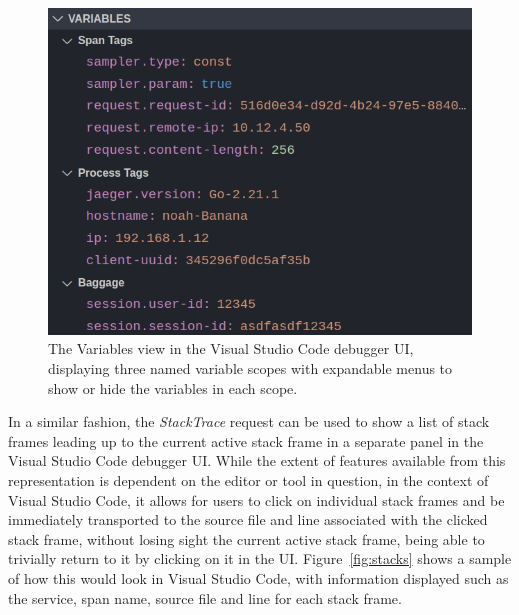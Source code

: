 \documentclass[12pt,pdftex,titlepage]{report}
\begin{document}
            \begin{figure}[htb!]
                \centering
                \includegraphics[scale=1.7]{scopes.png}
                \caption[Visual Studio Code debugger UI - Variables view]{The Variables view in the Visual Studio Code debugger UI, displaying three named variable scopes with expandable menus to show or hide the variables
                in each scope.}
                \label{fig:scopes}
            \end{figure}

            In a similar fashion, the \textit{StackTrace} request can be used to show a list of stack frames leading up to the current active stack frame in a separate panel in the Visual Studio Code debugger UI. While the extent of 
            features available from this representation is dependent on the editor or tool in question, in the context of Visual Studio Code, it allows for users to click on individual stack frames and be immediately transported 
            to the source file and line associated with the clicked stack frame, without losing sight the current active stack frame, being able to trivially return to it by clicking on it in the UI. Figure~\ref{fig:stacks} shows a 
            sample of how this would look in Visual Studio Code, with information displayed such as the service, span name, source file and line for each stack frame.
\end{document}
